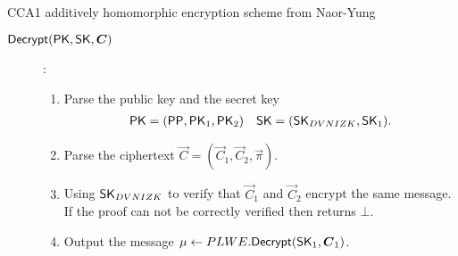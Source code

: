 \begin{section}{CCA1 additively homomorphic encryption scheme from Naor-Yung}
\begin{description}
    \item[$\Dec(\PK, \SK, \vec{C})$]:
    \begin{enumerate}
      \item Parse the public key and the secret key
      \begin{align*}
        \mathsf{PK} &= ({\mathsf{PP}}, \mathsf{PK}_1, \mathsf{PK}_2) & \mathsf{SK} = (\mathsf{SK}_{DVNIZK}, \mathsf{SK}_1).
      \end{align*}
      \item Parse the ciphertext $\vec{C} = (\vec{C}_1, \vec{C}_2, \vec{\pi})$.
      \item Using $\mathsf{SK}_{DVNIZK}$ to verify that $\vec{C}_1$ and $\vec{C}_2$ encrypt the same message.
      If the proof can not be correctly verified then returns $\bot$.
      \item Output the message $\mu \gets PLWE.\Dec(\SK_1, \vec{C}_1)$.
    \end{enumerate}
  \end{description}


\end{section}
